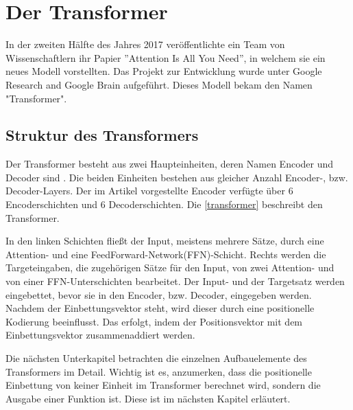 \chapter{Der Transformer} \label{Transformer}

In der zweiten Hälfte des Jahres 2017 veröffentlichte ein Team von Wissenschaftlern ihr Papier \textquotedblright Attention Is All You Need\textquotedblright \cite{Vaswani:2017}, in welchem sie ein neues Modell vorstellten. Das Projekt zur Entwicklung wurde unter Google Research and Google Brain aufgeführt. Dieses Modell bekam den Namen "Transformer".

\section{Struktur des Transformers}
Der Transformer besteht aus zwei Haupteinheiten, deren Namen Encoder und Decoder sind \cite{Vaswani:2017}. Die beiden Einheiten bestehen aus gleicher Anzahl Encoder-, bzw. Decoder-Layers. Der im Artikel vorgestellte Encoder verfügte über 6 Encoderschichten und 6 Decoderschichten. Die \cref{transformer} beschreibt den Transformer.

In den linken Schichten fließt der Input, meistens mehrere Sätze, durch eine Attention- und eine FeedForward-Network(FFN)-Schicht. Rechts werden die Targeteingaben, die zugehörigen Sätze für den Input, von zwei Attention- und von einer FFN-Unterschichten bearbeitet. Der Input- und der Targetsatz werden eingebettet, bevor sie in den Encoder, bzw. Decoder, eingegeben werden. Nachdem der Einbettungsvektor steht, wird dieser durch eine positionelle Kodierung beeinflusst. Das erfolgt, indem der Positionsvektor mit dem Einbettungsvektor zusammenaddiert werden.

Die nächsten Unterkapitel betrachten die einzelnen Aufbauelemente des Transformers im Detail. Wichtig ist es, anzumerken, dass die positionelle Einbettung von keiner Einheit im Transformer berechnet wird, sondern die Ausgabe einer Funktion ist. Diese ist im nächsten Kapitel erläutert.

